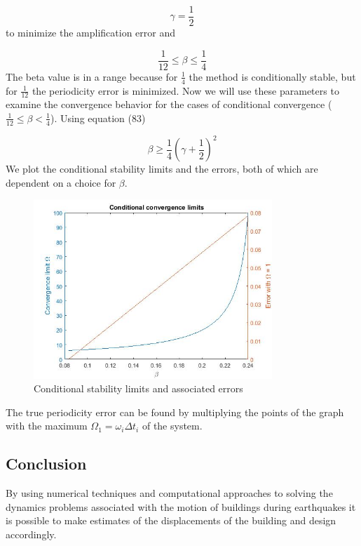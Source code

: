 \documentclass{article}
\begin{document}
				\begin{equation*}
					\gamma = \frac{1}{2}
				\end{equation*}
to minimize the amplification error and

				\begin{equation*}
					 \frac{1}{12} \leq \beta \leq  \frac{1}{4}
				\end{equation*}
The beta value is in a range because for $\frac{1}{4}$ the method is conditionally stable, but for $\frac{1}{12}$ the periodicity error is minimized. Now we will use these parameters to examine the convergence behavior for the cases of conditional convergence ($ \frac{1}{12} \leq \beta <  \frac{1}{4}$). Using equation (83)

				\begin{equation*}
					\beta \geq \frac{1}{4}\left(\gamma + \frac{1}{2}\right)^2
				\end{equation*}
We plot the conditional stability limits and the errors, both of which are dependent on a choice for $\beta$. 

				\begin{figure}[h!]
   					 \centering
   					 \includegraphics[width=90mm]{ccl3.jpg}
   					 \caption{Conditional stability limits and associated errors}
				            \label{fig17}
  				\end{figure}
The true periodicity error can be found by multiplying the points of the graph with the maximum $\Omega_1 = \omega_i\Delta t_i$ of the system.


	\subsection{Conclusion}
By using numerical techniques and computational approaches to solving the dynamics problems associated with the motion of buildings during earthquakes it is possible to make estimates of the displacements of the building and design accordingly.
\end{document}
